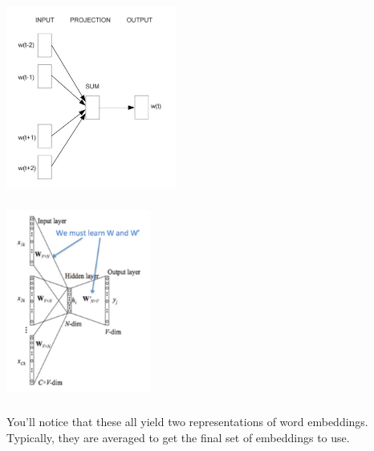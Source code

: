 \documentclass[xetex,mathserif,serif,aspectratio=169]{beamer}
\begin{document}
\begin{frame}[fragile] \frametitle{} \oldB \small

\begin{center}
\includegraphics[height=6cm]{img/continuousBagOfWords.jpg}
\end{center}

\end{frame}

\begin{frame}[fragile] \frametitle{} \oldB \small

\begin{center}
\includegraphics[height=6cm]{img/continuousBagOfWords2.jpg}
\end{center}

\end{frame}


\begin{frame}[fragile] \frametitle{} \oldB \small

You'll notice that these all yield two representations of
word embeddings. Typically, they are averaged to get the
final set of embeddings to use.

\end{frame}
\end{document}
